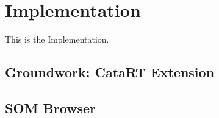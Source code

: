 
\section{Implementation}
\label{sec:implementation}
This is the Implementation.

\subsection{Groundwork: CataRT Extension}
\label{subsec:implementation_catart}

\subsection{SOM Browser}
\label{subsec:implementation_som_browser}
